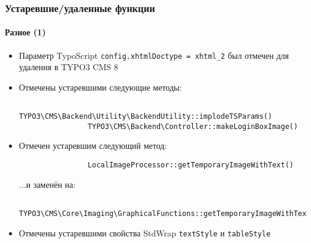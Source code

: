 \begin{frame}[fragile]
	\frametitle{Устаревшие/удаленные функции}
	\framesubtitle{Разное (1)}

	\begin{itemize}
		\item Параметр TypoScript \texttt{config.xhtmlDoctype = xhtml\_2} был отмечен для удаления в TYPO3 CMS 8

		\item Отмечены устаревшими следующие методы:
			\begin{lstlisting}
				TYPO3\CMS\Backend\Utility\BackendUtility::implodeTSParams()
				TYPO3\CMS\Backend\Controller::makeLoginBoxImage()
			\end{lstlisting}

		\item Отмечен устаревшим следующий метод:
			\begin{lstlisting}
				LocalImageProcessor::getTemporaryImageWithText()
			\end{lstlisting}

			...и заменён на:

			\begin{lstlisting}
				TYPO3\CMS\Core\Imaging\GraphicalFunctions::getTemporaryImageWithText()
			\end{lstlisting}

		\item Отмечены устаревшими свойства StdWrap \texttt{textStyle} и \texttt{tableStyle}

	\end{itemize}

\end{frame}


